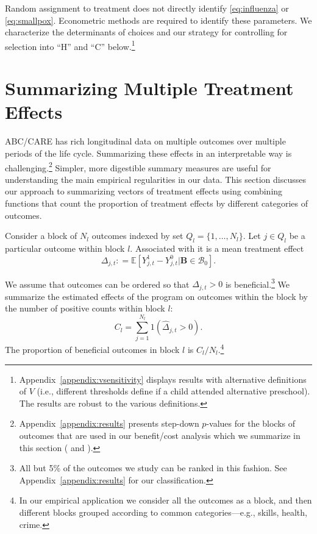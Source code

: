 Random assignment to treatment does not directly identify \eqref{eq:influenza} or \eqref{eq:smallpox}. Econometric methods are required to identify these parameters. We characterize the determinants of choices and our strategy for controlling for selection into ``H'' and ``C'' below.\footnote{Appendix~\ref{appendix:vsensitivity} displays results with alternative definitions of $V$ (i.e., different thresholds define if a child attended alternative preschool). The results are robust to the various definitions.}

\section{Summarizing Multiple Treatment Effects} \label{section:methodology}

ABC/CARE has rich longitudinal data on multiple outcomes over multiple periods of the life cycle. Summarizing these effects in an interpretable way is challenging.\footnote{Appendix~\ref{appendix:results} presents step-down $p$-values for the blocks of outcomes that are used in our benefit/cost analysis which we summarize in this section (\citealp{Lehman_Romano_2005_AnnStat} and \citealp{Romano_Shaikh_2006_AnnStat}).} Simpler, more digestible summary measures are useful for understanding the main empirical regularities in our data. This section discusses our approach to summarizing vectors of treatment effects using combining functions that count the proportion of treatment effects by different categories of outcomes.

Consider a block of $N_l$ outcomes indexed by set $Q_l = \{1,\dots,N_l\}$. Let $j \in Q_l$ be a particular outcome within block $l$. Associated with it is a mean treatment effect
\begin{equation}
\Delta_{j,t} : = \mathbb{E} \left[ Y^1_{j,t} - Y^0_{j,t} | \bm{B} \in \mathcal{B}_0 \right].
\end{equation}

We assume that outcomes can be ordered so that $\Delta_{j,t} >0$ is beneficial.\footnote{All but 5\% of the outcomes we study can be ranked in this fashion. See Appendix~\ref{appendix:results} for our classification.} We summarize the estimated effects of the program on outcomes within the block by the number of positive counts within block $l$:
\begin{equation}
C_l = \sum^{N_l}_{j=1} 1 (\hat{\Delta}_{j,t} >0).
\end{equation}
The proportion of beneficial outcomes in block $l$ is $C_l / N_l$.\footnote{In our empirical application we consider all the outcomes as a block, and then different blocks grouped according to common categories---e.g., skills, health, crime.}

